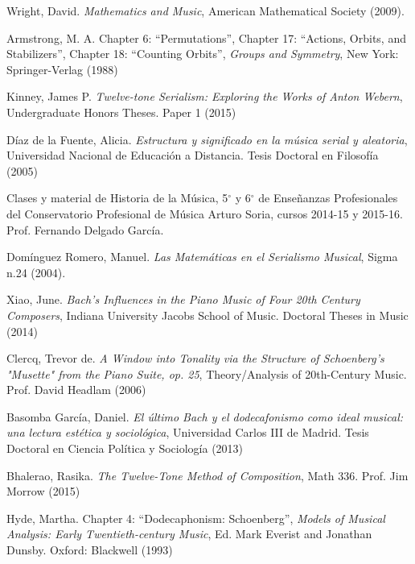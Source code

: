 	\begin{thebibliography}{00}

			{\sc Wright, David.} 
			\textit{Mathematics and Music},
			American Mathematical Society 
			(2009).
			
			{\sc Armstrong, M. A.} Chapter 6: “Permutations”, Chapter 17: “Actions, Orbits, and Stabilizers”, Chapter 18: “Counting Orbits”,
			\textit{Groups and Symmetry},
			New York: Springer-Verlag
			(1988)

			{\sc Kinney, James P.} 
			\textit{Twelve-tone Serialism: Exploring the Works of Anton Webern},
			Undergraduate Honors Theses.
			Paper 1
			(2015)
			
			{\sc Díaz de la Fuente, Alicia.} 
			\textit{Estructura y significado en la música serial y aleatoria},
			Universidad Nacional de Educación a Distancia.
			Tesis Doctoral en Filosofía
			(2005)
			
			Clases y material de Historia de la Música, 5$^{\circ}$ y 6$^{\circ}$ de Enseñanzas Profesionales del Conservatorio Profesional de Música Arturo Soria, cursos 2014-15 y 2015-16. Prof. Fernando Delgado García.
			
			{\sc Domínguez Romero, Manuel.} 
			\textit{Las Matemáticas en el Serialismo Musical},
			Sigma n.24 
			(2004).
					
			{\sc Xiao, June.} 
			\textit{Bach’s Influences in the Piano Music of Four 20th Century Composers},
			Indiana University Jacobs School of Music.
			Doctoral Theses in Music
			(2014)
			
			{\sc Clercq, Trevor de.} 
			\textit{A Window into Tonality via the Structure of Schoenberg's "Musette" from the Piano Suite, op. 25},
			Theory/Analysis of 20th-Century Music.
			Prof. David Headlam
			(2006)
			
			{\sc Basomba García, Daniel.} 
			\textit{El último Bach y el dodecafonismo como ideal musical: una lectura estética y sociológica},
			Universidad Carlos III de Madrid.
			Tesis Doctoral en Ciencia Política y Sociología
			(2013)
			
			{\sc Bhalerao, Rasika.} 
			\textit{The Twelve-Tone Method of Composition},
			Math 336.
			Prof. Jim Morrow
			(2015)
			
			{\sc Hyde, Martha.} Chapter 4: “Dodecaphonism: Schoenberg”,
			\textit{Models of Musical Analysis: Early Twentieth-century Music},
			Ed. Mark Everist and Jonathan Dunsby.
			Oxford: Blackwell
			(1993)
			

\end{thebibliography}
